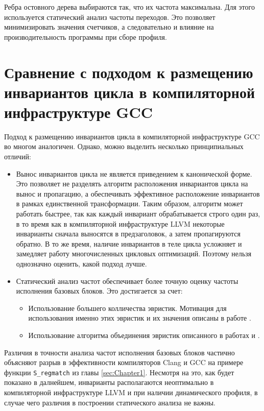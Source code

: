 Ребра остовного дерева выбираются так, что их частота максимальна.
Для этого используется статический анализ частоты переходов.
Это позволяет минимизировать значения счетчиков, а следовательно и влияние на производительность программы при сборе профиля.

\section{Сравнение с подходом к размещению инвариантов цикла в компиляторной инфраструктуре GCC}

Подход к размещению инвариантов цикла в компиляторной инфраструктуре GCC во многом аналогичен.
Однако, можно выделить несколько принципиальных отличий:
\begin{itemize}
    \item Вынос инвариантов цикла не является приведением к канонической форме.
        Это позволяет не разделять алгоритм расположения инвариантов цикла на вынос и пропагацию, а обеспечивать эффективное расположение инвариантов в рамках единственной трансформации.
        Таким образом, алгоритм может работать быстрее, так как каждый инвариант обрабатывается строго один раз, в то время как в компиляторной инфраструктуре LLVM некоторые инварианты сначала выносятся в предзаголовок, а затем пропагируются обратно.
        В то же время, наличие инвариантов в теле цикла усложняет и замедляет работу многочисленных цикловых оптимизаций.
        Поэтому нельзя однозначно оценить, какой подход лучше.
    \item Статический анализ частот обеспечивает более точную оценку частоты исполнения базовых блоков.
        Это достигается за счет:
    \begin{itemize}
        \item Использование большего колличества эвристик.
            Мотивация для использования именно этих эвристик и их значения описаны в работе \cite{Ball_Larus_1993}.
        \item Использование алгоритма объединения эвристик описанного в работах \cite{Youfeng_Wu_Larus} и \cite{Calder_Grunwald_Lindsay_Martin_Mozer_Zorn_1995}.
    \end{itemize}
\end{itemize}

Различия в точности анализа частот исполнения базовых блоков частично объясняют разрыв в эффективности компиляторов Clang и GCC на примере функции \texttt{S\_regmatch} из главы \ref{sec:Chapter1}.
Несмотря на это, как будет показано в далнейшем, инварианты располагаются неоптимально в компиляторной инфраструктуре LLVM и при наличии динамического профиля, в случае чего различия в построении статического анализа не важны.

\newpage
